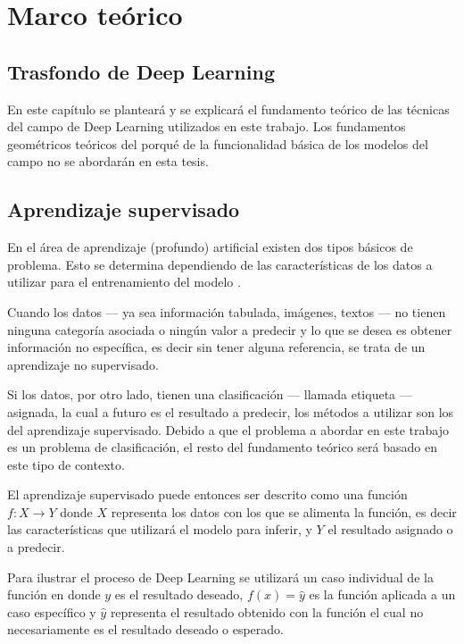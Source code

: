 \chapter{Marco teórico} %

\label{Chapter2} %

\section{Trasfondo de Deep Learning} %

En este capítulo se planteará y se explicará el fundamento teórico de las técnicas del campo de Deep Learning utilizados en este trabajo. Los fundamentos geométricos teóricos \parencite{2018leigeometric} del porqué de la funcionalidad básica de los modelos del campo no se abordarán en esta tesis.

\section{Aprendizaje supervisado}

En el área de aprendizaje (profundo) artificial existen dos tipos básicos de problema. Esto se determina dependiendo de las características de los datos a utilizar para el entrenamiento del modelo \parencite{schmidhuber2015deep}.

Cuando los datos --- ya sea información tabulada, imágenes, textos --- no tienen ninguna categoría asociada o ningún valor a predecir y lo que se desea es obtener información no específica, es decir sin tener alguna referencia, se trata de un aprendizaje no supervisado.

Si los datos, por otro lado, tienen una clasificación  --- llamada etiqueta --- asignada, la cual a futuro es el resultado a predecir, los métodos a utilizar son los del \gls{aprendizaje supervisado}. Debido a que el problema a abordar en este trabajo es un problema de clasificación, el resto del fundamento teórico será basado en este tipo de contexto.

El aprendizaje supervisado puede entonces ser descrito como una función $f : X \to Y$ donde $X$ representa los datos con los que se alimenta la función, es decir las características que utilizará el modelo para inferir, y $Y$ el resultado asignado o a predecir.

Para ilustrar el proceso de Deep Learning se utilizará un caso individual de la función en donde $y$ es el resultado deseado, $f(x) = \hat{y}$ es la función aplicada a un caso específico y $\hat{y}$ representa el resultado obtenido con la función el cual no necesariamente es el resultado deseado o esperado.

